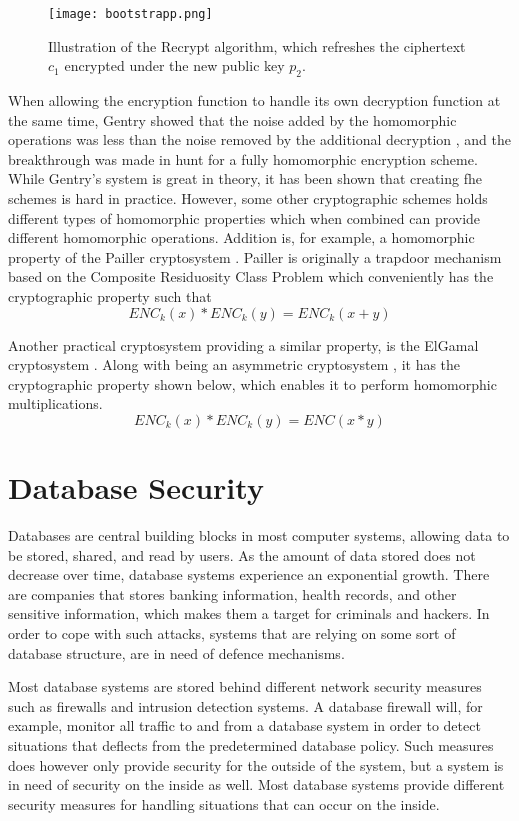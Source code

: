 \begin{figure}[h]
	\centering
	\texttt{[image: bootstrapp.png]}
	\caption{Illustration of the Recrypt algorithm, which refreshes the ciphertext $c_1$ encrypted under the new public key $p_2$.}
	\label{recrypt_function}
\end{figure}



When allowing the encryption function to handle its own decryption function at the same time, Gentry showed that the noise added by the homomorphic operations was less than the noise removed by the additional decryption \cite{Gentry_computing_arb_func_enc_data}, and the breakthrough was made in hunt for a fully homomorphic encryption scheme. While Gentry's system is great in theory, it has been shown that creating \gls{fhe} schemes is hard in practice. However, some other cryptographic schemes holds different types of homomorphic properties which when combined can provide different homomorphic operations. Addition is, for example, a homomorphic property of the Pailler cryptosystem \citep{Paillier}. Pailler is originally a trapdoor mechanism based on the Composite Residuosity Class Problem which conveniently has the cryptographic property such that \[ENC_k(x) * ENC_k(y) = ENC_k(x + y)\]

Another practical cryptosystem providing a similar property, is the ElGamal cryptosystem \cite{elgamal}. Along with being an asymmetric cryptosystem , it has the cryptographic property shown below, which enables it to perform homomorphic multiplications.  \[ENC_k(x) * ENC_k(y) = ENC(x * y)\]


\section{Database Security}
\label{chp:database_Security}

Databases are central building blocks in most computer systems, allowing data to be stored, shared, and read by users. As the amount of data stored does not decrease over time, database systems experience an exponential growth. There are companies that stores banking information, health records, and other sensitive information, which makes them a target for criminals and hackers. In order to cope with such attacks, systems that are relying on some sort of database structure, are in need of defence mechanisms. 


Most database systems are stored behind different network security measures such as firewalls and intrusion detection systems. A database firewall will, for example, monitor all traffic to and from a database system in order to detect situations that deflects from the predetermined database policy. Such measures does however only provide security for the outside of the system, but a system is in need of security on the inside as well. Most database systems provide different security measures for handling situations that can occur on the inside.

